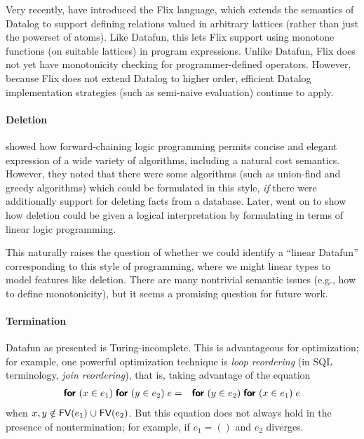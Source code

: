 Very recently, \citet{flix} have introduced the Flix language, which
extends the semantics of Datalog to support defining relations valued
in arbitrary lattices (rather than just the powerset of atoms). Like
Datafun, this lets Flix support using monotone functions (on suitable
lattices) in program expressions. Unlike Datafun, Flix does not yet
have monotonicity checking for programmer-defined operators. However,
because Flix does not extend Datalog to higher order, efficient
Datalog implementation strategies (such as semi-naive evaluation)
continue to apply.

\paragraph{Deletion} \citet{logical-algorithms} showed how
forward-chaining logic programming permits concise and elegant
expression of a wide variety of algorithms, including a natural cost
semantics. However, they noted that there were some algorithms (such
as union-find and greedy algorithms) which could be formulated in this
style, \emph{if} there were additionally support for deleting facts
from a database. Later, \citet{linear-logical-algorithms} went on to
show how deletion could be given a logical interpretation by
formulating in terms of linear logic programming.

This naturally raises the question of whether we could identify a
``linear Datafun'' corresponding to this style of programming, where
we might linear types to model features like deletion. There are many
nontrivial semantic issues (e.g., how to define monotonicity), but
it seems a promising question for future work.

\paragraph{Termination}

Datafun as presented is Turing-incomplete. This is advantageous for
optimization; for example, one powerful optimization technique is \emph{loop
  reordering} (in SQL terminology, \emph{join reordering}), that is, taking
advantage of the equation
\begin{eqnarray*}
  \textsf{\bfseries for}_{}\;({x \in e_1})\; \textsf{\bfseries for}_{}\;({y \in e_2})\; e
  &=& \textsf{\bfseries for}_{}\;({y \in e_2})\; \textsf{\bfseries for}_{}\;({x \in e_1})\; e
\end{eqnarray*}
when $x,y \notin \name{FV}(e_1) \cup \name{FV}(e_2)$. But this equation does not
always hold in the presence of nontermination; for example, if $e_1 = ()$ and
$e_2$ diverges.

